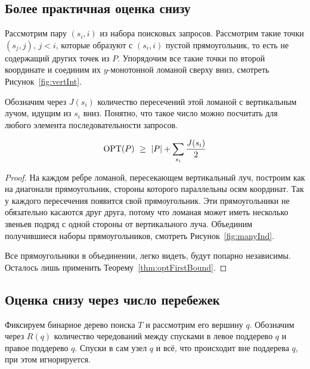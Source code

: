 \subsection{Более практичная оценка снизу}

Рассмотрим пару $(s_i,i)$ из набора поисковых запросов. Рассмотрим такие точки $(s_j, j)$, $j < i$, которые образуют с $(s_i, i)$ пустой прямоугольник, то есть не содержащий других точек из $P$. Упорядочим все такие точки по второй координате и соединим их $y$-монотонной ломаной сверху вниз, смотреть Рисунок~\ref{fig:vertInt}.



Обозначим через $J(s_i)$ количество пересечений этой ломаной с вертикальным лучом, идущим из $s_i$ вниз. Понятно, что такое число можно посчитать для любого элемента последовательности запросов.

\begin{theorem} \label{thm:optIndBound}
\begin{equation} \label{eq:optIndBound}
	\operatorname{OPT}(P)\ \ge\ |P| + \sum\limits_{s_i} \frac{J(s_i)}{2}
\end{equation}
\end{theorem}

\begin{proof}
На каждом ребре ломаной, пересекающем вертикальный луч, построим как на диагонали прямоугольник, стороны которого параллельны осям координат. Так у каждого пересечения появится свой прямоугольник. Эти прямоугольники не обязательно касаются друг друга, потому что ломаная может иметь несколько звеньев подряд с одной стороны от вертикального луча. Объединим получившиеся наборы прямоугольников, смотреть Рисунок~\ref{fig:manyInd}.



Все прямоугольники в объединении, легко видеть, будут попарно независимы. Осталось лишь применить Теорему~\ref{thm:optFirstBound}.
\end{proof}

\subsection{Оценка снизу через число перебежек}

Фиксируем бинарное дерево поиска $T$ и рассмотрим его вершину $q$. Обозначим через $R(q)$ количество чередований между спусками в левое поддерево $q$ и правое поддерево $q$. Спуски в сам узел $q$ и всё, что происходит вне поддерева $q$, при этом игнорируется.

